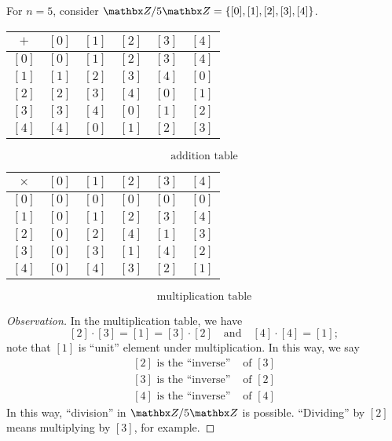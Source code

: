 
\begin{example}
For $n = 5$, consider $\zz/5\zz = \set{[0],[1],[2],[3],[4]}$.\\[1em]
\begin{minipage}{0.5\textwidth}
\begin{center}
{\renewcommand{\arraystretch}{1.5}%
\begin{tabular}{c|ccccc}
$+$ & $[0]$ & $[1]$ & $[2]$ & $[3]$ & $[4]$\\
\hline
$[0]$ & $[0]$ & $[1]$ & $[2]$ & $[3]$ & $[4]$\\
$[1]$ & $[1]$ & $[2]$ & $[3]$ & $[4]$ & $[0]$\\
$[2]$ & $[2]$ & $[3]$ & $[4]$ & $[0]$ & $[1]$\\
$[3]$ & $[3]$ & $[4]$ & $[0]$ & $[1]$ & $[2]$\\
$[4]$ & $[4]$ & $[0]$ & $[1]$ & $[2]$ & $[3]$\\
\end{tabular}
}
\end{center}
\[\text{addition table}\]
\end{minipage}\quad
\begin{minipage}{0.5\textwidth}
\begin{center}
{\renewcommand{\arraystretch}{1.5}%
\begin{tabular}{c|ccccc}
$\times$ & $[0]$ & $[1]$ & $[2]$ & $[3]$ & $[4]$\\
\hline
$[0]$ & $[0]$ & $[0]$ & $[0]$ & $[0]$ & $[0]$\\
$[1]$ & $[0]$ & $[1]$ & $[2]$ & $[3]$ & $[4]$\\
$[2]$ & $[0]$ & $[2]$ & $[4]$ & $[1]$ & $[3]$\\
$[3]$ & $[0]$ & $[3]$ & $[1]$ & $[4]$ & $[2]$\\
$[4]$ & $[0]$ & $[4]$ & $[3]$ & $[2]$ & $[1]$\\
\end{tabular}
}
\end{center}
\[\text{multiplication table}\]
\end{minipage}
\begin{proof}[Observation]\renewcommand{\qed}{}
In the multiplication table, we have
\[ [2]\cdot [3] = [1] = [3]\cdot [2] \quad \text{and} \quad [4]\cdot[4] = [1];\]
note that $[1]$ is ``unit'' element under multiplication.\newpage
In this way, we say
\begin{align*}
\text{$[2]$ is the ``inverse''}& \text{ of $[3]$}\\[0.5em]
\text{$[3]$ is the ``inverse''}& \text{ of $[2]$}\\[0.5em]
\text{$[4]$ is the ``inverse''}& \text{ of $[4]$}
\end{align*}
In this way, ``division'' in $\zz/5\zz$ is possible. ``Dividing'' by $[2]$ means multiplying by $[3]$, for example. 
\end{proof}
\end{example}


